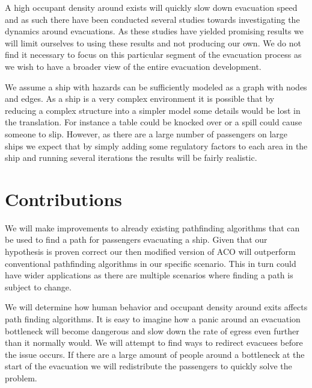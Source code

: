 A high occupant density around exists will quickly slow down evacuation speed and as such there have been conducted several studies
towards investigating the dynamics around evacuations. As these studies have yielded promising results we will
limit ourselves to using these results and not producing our own. We do not find it necessary to focus on this particular segment 
of the evacuation process as we wish to have a broader view of the entire evacuation development.

We assume a ship with hazards can be sufficiently modeled as a graph with nodes and edges. As a ship is a very complex
environment it is possible that by reducing a complex structure into a simpler model some details would be lost in the
translation. For instance a table could be knocked over or a spill could cause someone to slip. However, as there are a large number of 
passengers on large ships we expect that by simply adding some regulatory factors to each area in the ship and running
several iterations the results will be fairly realistic.                                                           %

\section{Contributions}

 We will make improvements to already existing pathfinding algorithms that can be used to find a path 
for passengers evacuating a ship. Given that our hypothesis is proven
correct our then modified version of ACO will outperform conventional pathfinding algorithms in our 
specific scenario. This in turn could have wider applications as there are multiple scenarios
where finding a path is subject to change. 

We will determine how human behavior and occupant density around exits affects path finding algorithms.
It is easy to imagine how a panic around an evacuation bottleneck will become dangerous and slow
down the rate of egress even further than it normally would. We will attempt to find ways to redirect
evacuees before the issue occurs. If there are a large amount of people around a bottleneck at the
start of the evacuation we will redistribute the passengers to quickly solve the problem.


